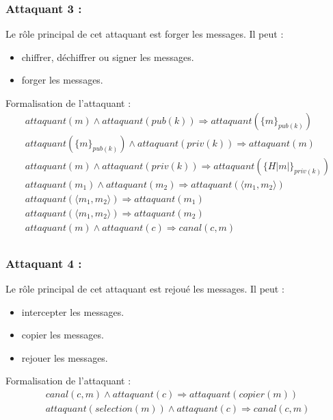 \documentclass[10pt,a4paper]{article}
\begin{document}
\subsubsection{Attaquant 3 :}
Le rôle principal de cet attaquant est forger les messages. Il peut :
\begin{itemize}
\item chiffrer, déchiffrer ou signer les messages.
\item forger les messages.\\
\end{itemize}
Formalisation de l'attaquant :   
\[
\begin{array}{l}
attaquant(m)\wedge attaquant(pub(k))\Longrightarrow attaquant({\lbrace m\rbrace}_{pub(k)})
\\
attaquant({\lbrace m\rbrace}_{pub(k)}) \wedge attaquant(priv(k))\Longrightarrow attaquant(m) 
\\ 
attaquant(m)\wedge attaquant(priv(k))\Longrightarrow attaquant({\lbrace H|m|\rbrace}_{priv(k)})
\\
attaquant(m_{1})\wedge attaquant(m_{2})\Longrightarrow attaquant(\langle m_{1},m_{2}\rangle)\\ 
attaquant(\langle m_{1},m_{2}\rangle)\Longrightarrow attaquant(m_{1})\\ 
attaquant(\langle m_{1},m_{2}\rangle)\Longrightarrow attaquant(m_{2})\\ 
attaquant(m)\wedge attaquant(c)\Longrightarrow canal(c,m)\\
 
  \end{array}
\]

\subsubsection{Attaquant 4 :}
Le rôle principal de cet attaquant est rejoué les messages. Il peut :
\begin{itemize}
\item intercepter les messages.
\item copier les messages.
\item rejouer les messages.\\
\end{itemize}
Formalisation de l'attaquant :   
\[
\begin{array}{l}
canal(c,m)\wedge attaquant(c)\Longrightarrow attaquant(copier(m))\\
attaquant(selection(m))\wedge attaquant(c)\Longrightarrow canal(c,m) 
  
  \end{array}
\]
\end{document}
